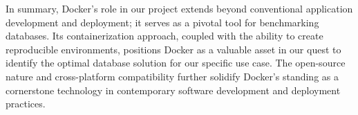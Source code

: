 In summary, Docker's role in our project extends beyond conventional application development and deployment; it serves as a pivotal tool for benchmarking 
databases. Its containerization approach, coupled with the ability to create reproducible environments, positions Docker as a valuable asset in our quest to 
identify the optimal database solution for our specific use case. The open-source nature and cross-platform compatibility further solidify Docker's standing as 
a cornerstone technology in contemporary software development and deployment practices.

\filbreak
